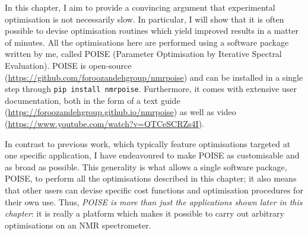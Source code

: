 In this chapter, I aim to provide a convincing argument that experimental optimisation is not necessarily slow.
In particular, I will show that it is often possible to devise optimisation routines which yield improved results in a matter of minutes.
All the optimisations here are performed using a software package written by me, called POISE (Parameter Optimisation by Iterative Spectral Evaluation).
POISE is open-source (\url{https://github.com/foroozandehgroup/nmrpoise}) and can be installed in a single step through \texttt{pip install nmrpoise}.
Furthermore, it comes with extensive user documentation, both in the form of a text guide (\url{https://foroozandehgroup.github.io/nmrpoise}) as well as video (\url{https://www.youtube.com/watch?v=QTCeSCRZs4I}).

In contrast to previous work, which typically feature optimisations targeted at one specific application, I have endeavoured to make POISE as customisable and as broad as possible.
This generality is what allows a single software package, POISE, to perform all the optimisations described in this chapter; it also means that other users can devise specific cost functions and optimisation procedures for their own use.
Thus, \textit{POISE is more than just the applications shown later in this chapter}: it is really a platform which makes it possible to carry out arbitrary optimisations on an NMR spectrometer.
